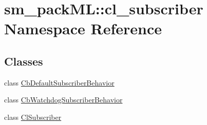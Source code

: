 \hypertarget{namespacesm__packML_1_1cl__subscriber}{}\section{sm\+\_\+pack\+ML\+:\+:cl\+\_\+subscriber Namespace Reference}
\label{namespacesm__packML_1_1cl__subscriber}
\subsection*{Classes}
\begin{DoxyCompactItemize}
\item 
class \hyperlink{classsm__packML_1_1cl__subscriber_1_1CbDefaultSubscriberBehavior}{Cb\+Default\+Subscriber\+Behavior}
\item 
class \hyperlink{classsm__packML_1_1cl__subscriber_1_1CbWatchdogSubscriberBehavior}{Cb\+Watchdog\+Subscriber\+Behavior}
\item 
class \hyperlink{classsm__packML_1_1cl__subscriber_1_1ClSubscriber}{Cl\+Subscriber}
\end{DoxyCompactItemize}
